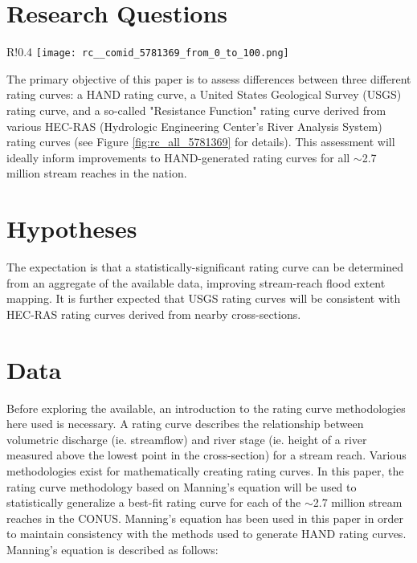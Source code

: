 \documentclass[12pt]{article}
\begin{document}
\section*{Research Questions} %


\begin{wrapfigure}{R!}{0.4\textwidth}
  \centering
  \vspace{-22pt}
  \texttt{[image: rc\_\_comid\_5781369\_from\_0\_to\_100.png]}
  \caption{Rating Curves for COMID 5781369} \label{fig:rc_all_5781369}
\end{wrapfigure}

The primary objective of this paper is to assess differences between three different rating curves: a HAND rating curve, a United States Geological Survey (USGS) rating curve, and a so-called "Resistance Function" rating curve derived from various HEC-RAS (Hydrologic Engineering Center's River Analysis System) rating curves (see Figure \ref{fig:rc_all_5781369} for details). This assessment will ideally inform improvements to HAND-generated rating curves for all $\sim$2.7 million stream reaches in the nation. 

\section*{Hypotheses} %

The expectation is that a statistically-significant rating curve can be determined from an aggregate of the available data, improving stream-reach flood extent mapping. It is further expected that USGS rating curves will be consistent with HEC-RAS rating curves derived from nearby cross-sections. 

\section*{Data}

Before exploring the available, an introduction to the rating curve methodologies here used is necessary. A rating curve describes the relationship between volumetric discharge (ie. streamflow) and river stage (ie. height of a river measured above the lowest point in the cross-section) for a stream reach. Various methodologies exist for mathematically creating rating curves. In this paper, the rating curve methodology based on Manning's equation will be used to statistically generalize a best-fit rating curve for each of the $\sim$2.7 million stream reaches in the CONUS. Manning's equation has been used in this paper in order to maintain consistency with the methods used to generate HAND rating curves. Manning's equation is described as follows: 
\end{document}
